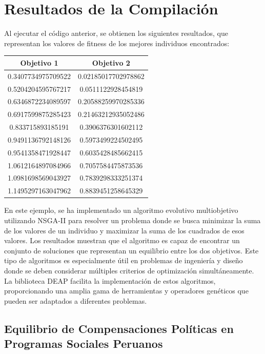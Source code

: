 \documentclass[12pt]{article}
\begin{document}
\section*{Resultados de la Compilación}
Al ejecutar el código anterior, se obtienen los siguientes resultados, que representan los valores de fitness de los mejores individuos encontrados:

\begin{center}
	\begin{tabular}{|c|c|}
		\hline
		\textbf{Objetivo 1} & \textbf{Objetivo 2} \\
		\hline
		0.3407734975709522 & 0.02185017702978862 \\
		0.5204204595767217 & 0.0511122928454819 \\
		0.6346872234089597 & 0.20588259970285336 \\
		0.6917599875285423 & 0.21463212935052486 \\
		0.833715893185191 & 0.3906376301602112 \\
		0.9491136792148126 & 0.5973499224502495 \\
		0.9541358471928447 & 0.6035428485662415 \\
		1.0612164897084966 & 0.7057584475873536 \\
		1.0981698569043927 & 0.7839298333251374 \\
		1.1495297163047962 & 0.8839451258645329 \\
		\hline
	\end{tabular}
\end{center}

En este ejemplo, se ha implementado un algoritmo evolutivo multiobjetivo utilizando NSGA-II para resolver un problema donde se busca minimizar la suma de los valores de un individuo y maximizar la suma de los cuadrados de esos valores. Los resultados muestran que el algoritmo es capaz de encontrar un conjunto de soluciones que representan un equilibrio entre los dos objetivos. Este tipo de algoritmos es especialmente útil en problemas de ingeniería y diseño donde se deben considerar múltiples criterios de optimización simultáneamente. La biblioteca DEAP facilita la implementación de estos algoritmos, proporcionando una amplia gama de herramientas y operadores genéticos que pueden ser adaptados a diferentes problemas.



\subsection{Equilibrio de Compensaciones Políticas en Programas Sociales Peruanos}
\end{document}
